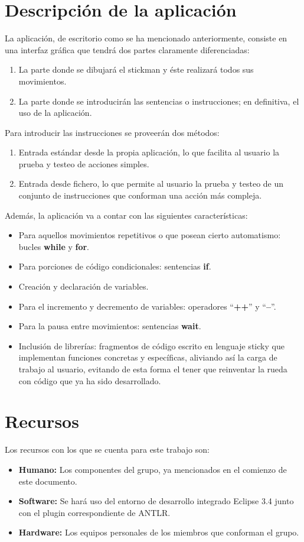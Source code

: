 \documentclass[a4paper,12pt]{article}
\begin{document}
  \section{Descripción de la aplicación}
  La aplicación, de escritorio como se ha mencionado anteriormente, consiste en una interfaz gráfica que tendrá dos partes claramente diferenciadas:
  \begin{enumerate}
    \item La parte donde se dibujará el stickman y éste realizará todos sus movimientos.
    \item La parte donde se introducirán las sentencias o instrucciones; en definitiva, el uso de la aplicación. \\
  \end{enumerate}
  Para introducir las instrucciones se proveerán dos métodos:
  \begin{enumerate}
    \item Entrada estándar desde la propia aplicación, lo que facilita al usuario la prueba y testeo de acciones simples.
    \item Entrada desde fichero, lo que permite al usuario la prueba y testeo de un conjunto de instrucciones que conforman una acción más compleja.\\
  \end{enumerate}
  Además, la aplicación va a contar con las siguientes características:
  \begin{itemize}
    \item Para aquellos movimientos repetitivos o que posean cierto automatismo: bucles \textbf{while} y \textbf{for}.
    \item Para porciones de código condicionales: sentencias \textbf{if}.
    \item Creación y declaración de variables.
    \item Para el incremento y decremento de variables: operadores ``\textbf{++}'' y ``\textbf{--}''.
    \item Para la pausa entre movimientos: sentencias \textbf{wait}.
    \item Inclusión de librerías: fragmentos de código escrito en lenguaje sticky que implementan funciones concretas y específicas, aliviando así la
	  carga de trabajo al usuario, evitando de esta forma el tener que reinventar la rueda con código que ya ha sido desarrollado.
  \end{itemize}



  
  \section{Recursos}
  Los recursos con los que se cuenta para este trabajo son: 
  \begin{itemize}
    \item \textbf{Humano:} Los componentes del grupo, ya mencionados en el comienzo de este documento.
    \item \textbf{Software:} Se hará uso del entorno de desarrollo integrado Eclipse 3.4 junto con el plugin correspondiente de ANTLR.
    \item \textbf{Hardware:} Los equipos personales de los miembros que conforman el grupo.
  \end{itemize}
\end{document}
